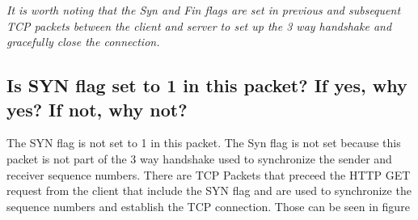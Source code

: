 \documentclass{assignment-x}
\begin{document}
\textit{It is worth noting that the Syn and Fin flags are set in previous and subsequent TCP  packets between the client and server to set up the 3 way handshake and gracefully close the connection.}

\subsection{Is SYN flag set to 1 in this packet? If yes, why yes? If not, why not?}
The SYN flag is not set to 1 in this packet. The Syn flag is not set because this packet is not part of the 3 way handshake used to synchronize the sender and receiver sequence numbers. There are TCP Packets that preceed the HTTP GET request from the client that include the SYN flag and are used to synchronize the sequence numbers and establish the TCP connection. Those can be seen in figure 
\end{document}
